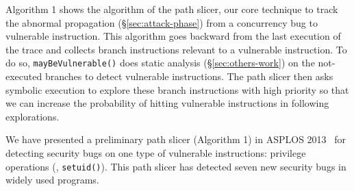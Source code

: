 Algorithm 1 shows the algorithm of the path slicer, our core 
technique to track the abnormal propagation (\S\ref{sec:attack-phase}) from a concurrency bug 
to vulnerable instruction. This algorithm goes backward from the 
last execution of the trace and collects branch instructions relevant to a 
vulnerable instruction. To do so, \texttt{mayBeVulnerable()} does 
static analysis (\S\ref{sec:others-work}) on the not-executed branches to 
detect vulnerable instructions. The path slicer then asks symbolic execution 
to explore these branch instructions with high priority so that we can increase the 
probability of hitting vulnerable instructions in following explorations.





 


 We have presented a preliminary path slicer (Algorithm 1)
in ASPLOS 2013~\cite{woodpecker:asplos13} for detecting security bugs on one type of 
vulnerable instructions: privilege operations (\eg, \texttt{setuid()}). 
This path slicer has detected seven new security bugs in widely used programs.

